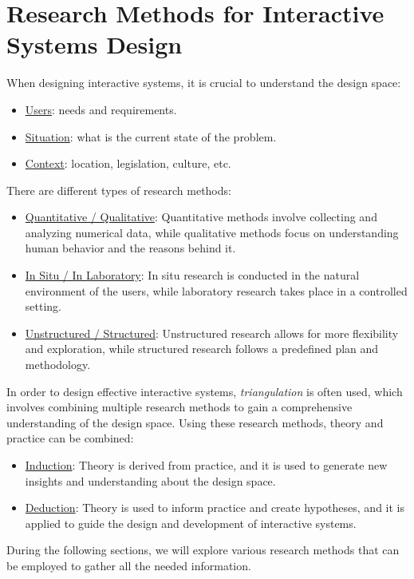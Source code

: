 \chapter{Research Methods for Interactive Systems Design}

When designing interactive systems, it is crucial to understand the design space:
\begin{itemize}
    \item \ul{Users}: needs and requirements.
    \item \ul{Situation}: what is the current state of the problem.
    \item \ul{Context}: location, legislation, culture, etc.
\end{itemize}

There are different types of research methods:
\begin{itemize}
    \item \ul{Quantitative / Qualitative}: Quantitative methods involve collecting and analyzing numerical data, while qualitative methods focus on understanding human behavior and the reasons behind it.
    \item \ul{In Situ / In Laboratory}: In situ research is conducted in the natural environment of the users, while laboratory research takes place in a controlled setting.
    \item \ul{Unstructured / Structured}: Unstructured research allows for more flexibility and exploration, while structured research follows a predefined plan and methodology.
\end{itemize}

In order to design effective interactive systems, \emph{triangulation} is often used, which involves combining multiple research methods to gain a comprehensive understanding of the design space. Using these research methods, theory and practice can be combined:
\begin{itemize}
    \item \ul{Induction}: Theory is derived from practice, and it is used to generate new insights and understanding about the design space.
    \item \ul{Deduction}: Theory is used to inform practice and create hypotheses, and it is applied to guide the design and development of interactive systems.
\end{itemize}

During the following sections, we will explore various research methods that can be employed to gather all the needed information.

